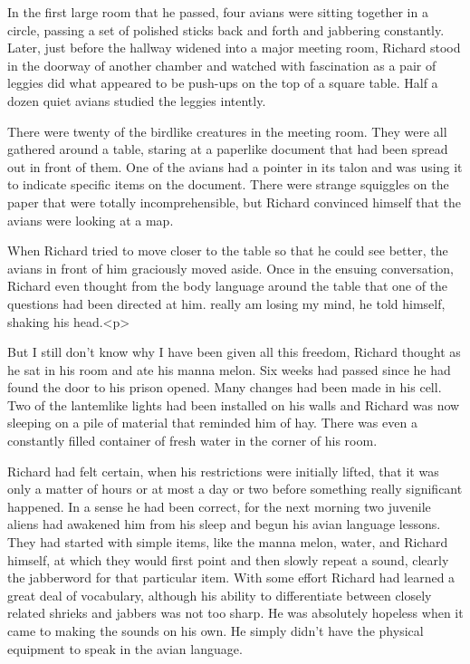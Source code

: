 \documentclass[]{article}
\begin{document}
{In the first large room that he passed, four avians were sitting together in a circle, passing a set of polished sticks back and forth and jabbering constantly. Later, just before the hallway widened into a major meeting room, Richard stood in the doorway of another chamber and watched with fascination as a pair of leggies did what appeared to be push-ups on the top of a square table. Half a dozen quiet avians studied the leggies intently.

There were twenty of the birdlike creatures in the meeting room. They were all gathered around a table, staring at a paperlike document that had been spread out in front of them. One of the avians had a pointer in its talon and was using it to indicate specific items on the document. There were strange squiggles on the paper that were totally incomprehensible, but Richard convinced himself that the avians were looking at a map.

When Richard tried to move closer to the table so that he could see better, the avians in front of him graciously moved aside. Once in the ensuing conversation, Richard even thought from the body language around the table that one of the questions had been directed at him. really am losing my mind, he told himself, shaking his head.<p>

But I still don’t know why I have been given all this freedom, Richard thought as he sat in his room and ate his manna melon. Six weeks had passed since he had found the door to his prison opened. Many changes had been made in his cell. Two of the lantemlike lights had been installed on his walls and Richard was now sleeping on a pile of material that reminded him of hay. There was even a constantly filled container of fresh water in the corner of his room.

Richard had felt certain, when his restrictions were initially lifted, that it was only a matter of hours or at most a day or two before something really significant happened. In a sense he had been correct, for the next morning two juvenile aliens had awakened him from his sleep and begun his avian language lessons. They had started with simple items, like the manna melon, water, and Richard himself, at which they would first point and then slowly repeat a sound, clearly the jabberword for that particular item. With some effort Richard had learned a great deal of vocabulary, although his ability to differentiate between closely related shrieks and jabbers was not too sharp. He was absolutely hopeless when it came to making the sounds on his own. He simply didn’t have the physical equipment to speak in the avian language.

}
\end{document}
